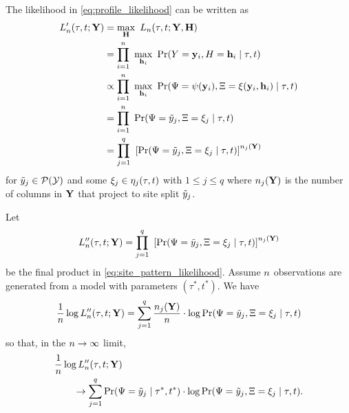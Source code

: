 The likelihood in \eqref{eq:profile_likelihood} can be written as
\begin{align}
L_\nCols'(\tau, t; \fullAlignment) &= \max_{\fullAncestralStates} \ L_\nCols(\tau, t; \fullAlignment, \fullAncestralStates) \nonumber \\
                             &= \prod_{i=1}^{\nCols} \ \max_{\ancestralStateColumn_i} \ \Pr(\alignmentColumnRV=\alignmentColumn_i, \ancestralStateColumnRV=\ancestralStateColumn_i \mid \tau, t) \nonumber \\
                             &\propto \prod_{i=1}^{\nCols} \ \max_{\ancestralStateColumn_i} \ \Pr(\siteSplitRV=\patternToSplit(\alignmentColumn_i), \ancestralSplitRV=\ancestralToSplit(\alignmentColumn_i, \ancestralStateColumn_i) \mid \tau, t) \nonumber \\
                             &= \prod_{i=1}^{\nCols} \ \Pr(\siteSplitRV=\siteSplit_j, \ancestralSplitRV=\xi_j \mid \tau, t) \nonumber \\
                             &= \prod_{j=1}^{\nSiteSplits} \ \left[\Pr(\siteSplitRV=\siteSplit_j, \ancestralSplitRV=\xi_j \mid \tau, t)\right] ^{\nCols_j(\fullAlignment)} \label{eq:site_pattern_likelihood}
\end{align}
for $\tilde{y}_j\in\mathcal{P}(\mathcal{Y})$ and some $\xi_j\in\eta_j(\tau, t)$ with $1 \le j \le q$ where $n_j(\mathbf{Y})$ is the number of columns in $\mathbf{Y}$ that project to site split $\tilde{y}_j$.

Let
\[
L_n''(\tau, t; \mathbf{Y}) = \prod_{j=1}^{q} \ \left[\Pr(\Psi=\tilde{y}_j, \Xi=\xi_j \mid \tau, t)\right] ^{n_j(\mathbf{Y})}
\]
be the final product in \eqref{eq:site_pattern_likelihood}.
Assume $n$ observations are generated from a model with parameters $(\tau^*, t^*)$.
We have
\begin{equation*}
\frac{1}{n} \log L_n''(\tau, t; \mathbf{Y}) = \sum_{j=1}^q \frac{n_j(\mathbf{Y})}{n}\cdot  \log \Pr(\Psi=\tilde{y}_j, \Xi=\xi_j \mid \tau, t)
\end{equation*}
so that, in the $n\rightarrow\infty$ limit,
\begin{equation}
\begin{split}
&    \frac{1}{n} \log L_n''(\tau, t; \mathbf{Y}) \\
&\qquad \rightarrow \sum_{j=1}^q \Pr(\Psi=\tilde{y}_j \mid \tau^*, t^*) \cdot \log \Pr(\Psi=\tilde{y}_j, \Xi=\xi_j \mid \tau, t). \label{eq:site_pattern_profile_likelihood_mean}
\end{split}
\end{equation}

